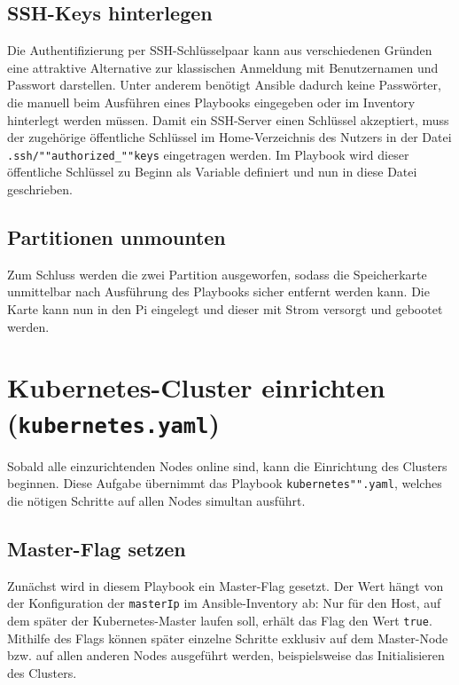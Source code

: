 \subsection{SSH-Keys hinterlegen}\label{subsec:ssh-keys-hinterlegen}

Die Authentifizierung per SSH-Schlüsselpaar kann aus verschiedenen Gründen eine attraktive Alternative zur klassischen Anmeldung mit Benutzernamen und Passwort darstellen.
Unter anderem benötigt Ansible dadurch keine Passwörter, die manuell beim Ausführen eines Playbooks eingegeben oder im Inventory hinterlegt werden müssen.
Damit ein SSH-Server einen Schlüssel akzeptiert, muss der zugehörige öffentliche Schlüssel im Home-Verzeichnis des Nutzers in der Datei \texttt{.ssh/""authorized\_""keys} eingetragen werden.
Im Playbook wird dieser öffentliche Schlüssel zu Beginn als Variable definiert und nun in diese Datei geschrieben.

\subsection{Partitionen unmounten}\label{subsec:partitionen-unmounten}

Zum Schluss werden die zwei Partition ausgeworfen, sodass die Speicherkarte unmittelbar nach Ausführung des Playbooks sicher entfernt werden kann.
Die Karte kann nun in den Pi eingelegt und dieser mit Strom versorgt und gebootet werden.

\section{Kubernetes-Cluster einrichten (\texttt{kubernetes.yaml})}

Sobald alle einzurichtenden Nodes online sind, kann die Einrichtung des Clusters beginnen.
Diese Aufgabe übernimmt das Playbook \texttt{kubernetes"".yaml}, welches die nötigen Schritte auf allen Nodes simultan ausführt.

\subsection{Master-Flag setzen}\label{subsec:master-flag-setzen}

Zunächst wird in diesem Playbook ein Master-Flag gesetzt.
Der Wert hängt von der Konfiguration der \texttt{masterIp} im Ansible-Inventory ab:
Nur für den Host, auf dem später der Kubernetes-Master laufen soll, erhält das Flag den Wert \texttt{true}.
Mithilfe des Flags können später einzelne Schritte exklusiv auf dem Master-Node bzw. auf allen anderen Nodes ausgeführt werden, beispielsweise das Initialisieren des Clusters.

